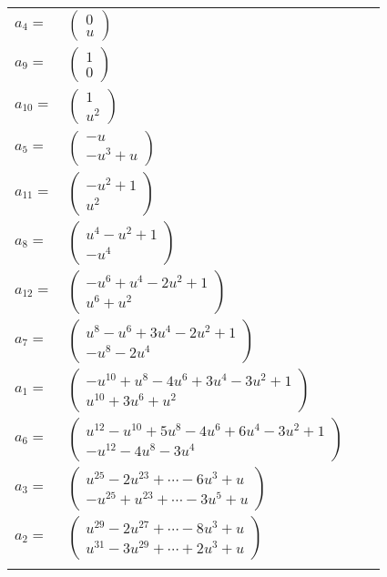 \documentclass[1p]{elsarticle_modified}
\theoremstyle{definition}
\begin{document}
\begin{tabular}{m{7pt} m{180pt} m{7pt} m{180pt} }
\flushright $a_{4}=$&$\begin{pmatrix}0\\u\end{pmatrix}$ \\
\flushright $a_{9}=$&$\begin{pmatrix}1\\0\end{pmatrix}$ \\
\flushright $a_{10}=$&$\begin{pmatrix}1\\u^2\end{pmatrix}$ \\
\flushright $a_{5}=$&$\begin{pmatrix}- u\\- u^3+u\end{pmatrix}$ \\
\flushright $a_{11}=$&$\begin{pmatrix}- u^2+1\\u^2\end{pmatrix}$ \\
\flushright $a_{8}=$&$\begin{pmatrix}u^4- u^2+1\\- u^4\end{pmatrix}$ \\
\flushright $a_{12}=$&$\begin{pmatrix}- u^6+u^4-2 u^2+1\\u^6+u^2\end{pmatrix}$ \\
\flushright $a_{7}=$&$\begin{pmatrix}u^8- u^6+3 u^4-2 u^2+1\\- u^8-2 u^4\end{pmatrix}$ \\
\flushright $a_{1}=$&$\begin{pmatrix}- u^{10}+u^8-4 u^6+3 u^4-3 u^2+1\\u^{10}+3 u^6+u^2\end{pmatrix}$ \\
\flushright $a_{6}=$&$\begin{pmatrix}u^{12}- u^{10}+5 u^8-4 u^6+6 u^4-3 u^2+1\\- u^{12}-4 u^8-3 u^4\end{pmatrix}$ \\
\flushright $a_{3}=$&$\begin{pmatrix}u^{25}-2 u^{23}+\cdots-6 u^3+u\\- u^{25}+u^{23}+\cdots-3 u^5+u\end{pmatrix}$ \\
\flushright $a_{2}=$&$\begin{pmatrix}u^{29}-2 u^{27}+\cdots-8 u^3+u\\u^{31}-3 u^{29}+\cdots+2 u^3+u\end{pmatrix}$\\&\end{tabular}
\end{document}
